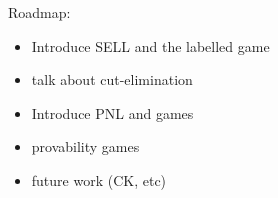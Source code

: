 
Roadmap:
\begin{itemize}
\item Introduce SELL and the labelled game
\item talk about cut-elimination
\item Introduce PNL and games
\item provability games
\item future work (CK, etc)
\end{itemize}



